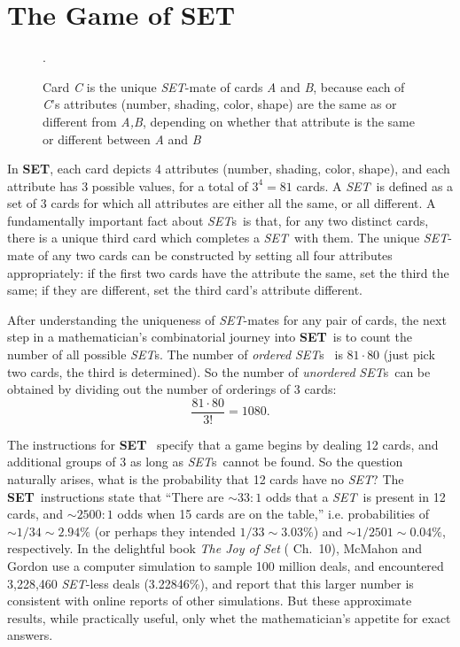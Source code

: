 \documentclass{article}
\newcommand{\SET}{{\em SET}}
\newcommand{\SETs}{{\em SET}s}
\newcommand{\SETg}{{\bf SET}}
\begin{document}
\section{The Game of \SETg}
\begin{figure}[!b]
  \caption{\label{SETMATES}Card {\em C} is the unique \SET-mate of cards {\em A}
    and {\em B}, because each of {\em C}'s attributes (number, shading, color,
    shape) are the same as or different from {\em A,B}, depending on whether
    that attribute is the same or different between {\em A} and {\em B}}.
\end{figure}
In \SETg, each card depicts 4 attributes (number, shading, color, shape),
and each attribute has 3 possible values, for a total of $3^4=81$ cards. A
\SET~is defined as a set of 3 cards for which all attributes are either all the
same, or all different. A fundamentally important fact about \SETs~is that, for
any two distinct cards, there is a unique third card which completes a \SET~with
them. The unique \SET-mate of any two cards can be constructed by setting all
four attributes appropriately: if the first two cards have the attribute the
same, set the third the same; if they are different, set the third card's
attribute different.

After understanding the uniqueness of \SET-mates for any pair of cards, the next
step in a mathematician's combinatorial journey into \SETg~is to count the number
of all possible \SETs. The number of {\em ordered} \SETs~ is $81\cdot 80$ (just
pick two cards, the third is determined). So the number of {\em unordered}
\SETs~can be obtained by dividing out the number of orderings of 3 cards:
$$\frac{81\cdot 80}{3!} = 1080.$$

The instructions for \SETg~\cite{SET} specify that a game begins by dealing 12
cards, and additional groups of 3 as long as \SETs~cannot be found. So the
question naturally arises, what is the probability that 12 cards have no \SET?
The \SETg~instructions state that ``There are $\sim 33:1$ odds that a \SET~is
present in 12 cards, and \mbox{$\sim 2500:1$} odds when 15 cards are on the
table,'' i.e. probabilities of $\sim 1/34\sim 2.94\%$ (or perhaps they intended
$1/33\sim 3.03\%$) and $\sim 1/2501\sim 0.04\%$, respectively. In the delightful
book {\em The Joy of Set} (\cite{JOS} Ch.~10), McMahon and Gordon use a computer
simulation to sample 100 million deals, and encountered 3,228,460 \SET-less
deals (3.22846\%), and report that this larger number is consistent with online
reports of other simulations. But these approximate results, while practically
useful, only whet the mathematician's appetite for exact answers.
\end{document}
